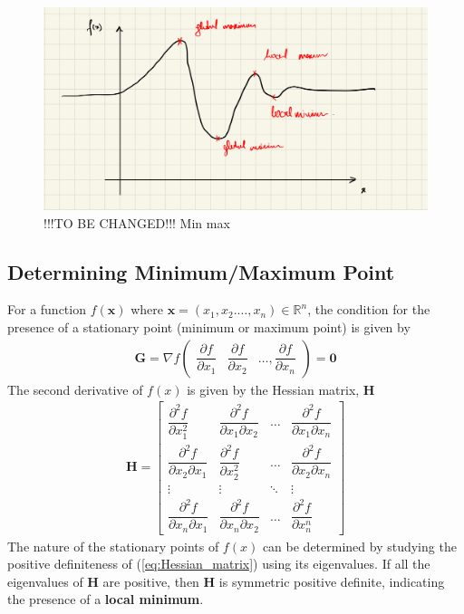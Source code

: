 \begin{figure}[ht]
    \centering
    \includegraphics[scale=0.15]{CHAPTER_3/c3_fig_min_max.jpeg}
    \caption{!!!TO BE CHANGED!!! Min max }
    \label{fig:min_max_illustration}
\end{figure}
\subsection*{Determining Minimum/Maximum Point}
For a function $f(\textbf{x})$ where $\textbf{x} = (x_1,x_2. \dots, x_n) \in \mathbb{R}^n$, the condition for the presence of a stationary point (minimum or maximum point) is given by
\begin{align}
    \label{eq:grad_f_x}
    \textbf{G} = \nabla f \begin{pmatrix}
        \dfrac{\partial f}{\partial x_1} & \dfrac{\partial f}{\partial x_2} & \dots , \dfrac{\partial f}{\partial x_n}
    \end{pmatrix} = \textbf{0}
\end{align}
The second derivative of $f(x)$ is given by the Hessian matrix, $\textbf{H}$
\begin{align}
    \label{eq:Hessian_matrix}
    \textbf{H} = \begin{bmatrix}
        \dfrac{\partial^2 f}{\partial x_1^2} & \dfrac{\partial^2 f}{\partial x_1 \partial x_2} & \dots & \dfrac{\partial^2 f}{\partial x_1 \partial x_n} \\
        \dfrac{\partial^2 f}{\partial x_2\partial x_1} & \dfrac{\partial^2 f}{\partial x_2^2} & \dots & \dfrac{\partial^2 f}{\partial x_2 \partial x_n} \\
        \vdots & \vdots & \ddots & \vdots \\
        \dfrac{\partial^2 f}{\partial x_n\partial x_1} & \dfrac{\partial^2 f}{\partial x_n \partial x_2} & \dots & \dfrac{\partial^2 f}{\partial x_n^n}
    \end{bmatrix}
\end{align}
The nature of the stationary points of $f(x)$ can be determined by studying the positive definiteness of (\ref{eq:Hessian_matrix}) using its eigenvalues. If all the eigenvalues of $\textbf{H}$ are positive, then $\textbf{H}$ is symmetric positive definite, indicating the presence of a \textbf{local minimum}.
